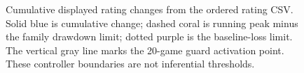 \begin{figure}[p]
\caption{Cumulative displayed rating changes from the ordered rating CSV.
Solid blue is cumulative change; dashed coral is running peak minus the family
drawdown limit; dotted purple is the baseline-loss limit. The vertical gray
line marks the 20-game guard activation point. These controller boundaries
are not inferential thresholds.}
\label{fig:v33-sequential}
\end{figure}
